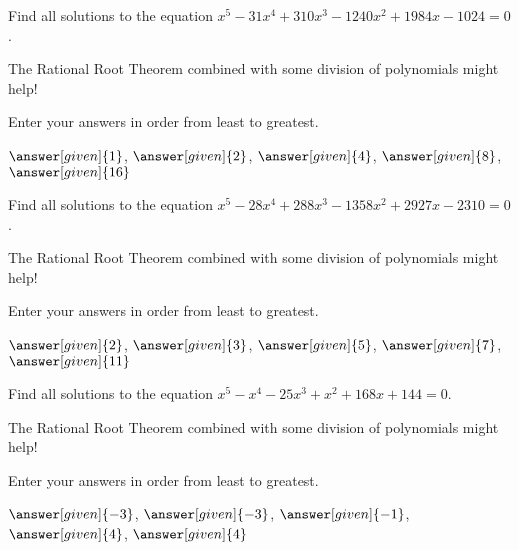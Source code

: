 \documentclass[nooutcomes]{ximera}
\begin{document}
\begin{problem}
Find all solutions to the equation $x^5-31x^4+310x^3-1240x^2+1984x-1024=0$. 
\begin{hint} 
The Rational Root Theorem combined with some division of polynomials might help!
\end{hint}
Enter your answers in order from least to greatest.

\begin{prompt}
$\answer[given]{1}$, $\answer[given]{2}$, $\answer[given]{4}$, $\answer[given]{8}$, $\answer[given]{16}$
\end{prompt}
\end{problem}


\begin{problem}
Find all solutions to the equation $x^5-28x^4+288x^3-1358x^2+2927x-2310=0$. 
\begin{hint} 
The Rational Root Theorem combined with some division of polynomials might help!
\end{hint}
Enter your answers in order from least to greatest.

\begin{prompt}
$\answer[given]{2}$, $\answer[given]{3}$, $\answer[given]{5}$, $\answer[given]{7}$, $\answer[given]{11}$
\end{prompt}
\end{problem}


\begin{problem}
Find all solutions to the equation $x^5-x^4-25x^3+x^2+168x+144=0$. 
\begin{hint} 
The Rational Root Theorem combined with some division of polynomials might help!
\end{hint}
Enter your answers in order from least to greatest.

\begin{prompt}
$\answer[given]{-3}$, $\answer[given]{-3}$, $\answer[given]{-1}$, $\answer[given]{4}$, $\answer[given]{4}$
\end{prompt}
\end{problem}
\end{document}
